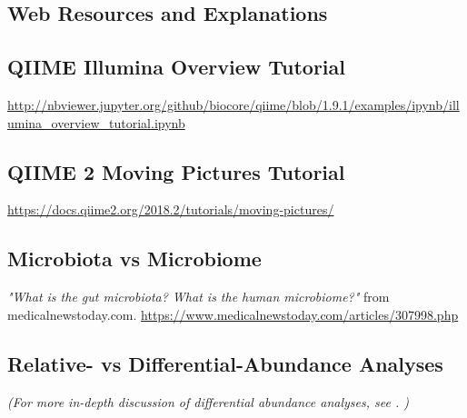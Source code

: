 %
\begin{fullpage}

    \appendix
    \chapter{Web Resources and Explanations}
    
    \section{QIIME Illumina Overview Tutorial}
    \label{appendix:IlluminaOverTut}
    \url{http://nbviewer.jupyter.org/github/biocore/qiime/blob/1.9.1/examples/ipynb/illumina_overview_tutorial.ipynb}
    
    \section{QIIME 2 Moving Pictures Tutorial}
    \label{appendix:MovingPicTut}
    \url{https://docs.qiime2.org/2018.2/tutorials/moving-pictures/}

    \section{Microbiota vs Microbiome}
    \label{appendix:microbiome-vs-microbiota}
    \textit{"What is the gut microbiota? What is the human microbiome?"} from medicalnewstoday.com.
    \url{https://www.medicalnewstoday.com/articles/307998.php}


    \section{Relative- vs Differential-Abundance Analyses}
    \label{appendix:abundance-analyses}
    \textit{(For more in-depth discussion of differential abundance analyses, see \citep{Mandal2015a}. )}
    

\end{fullpage}
